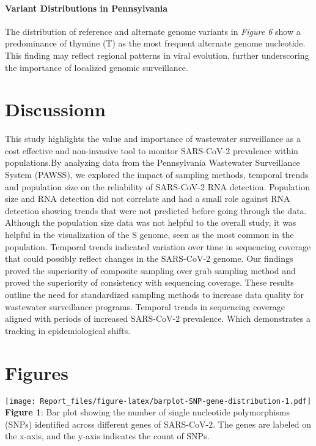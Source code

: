 \documentclass[
]{article}
\begin{document}
\hypertarget{variant-distributions-in-pennsylvania}{%
\paragraph{Variant Distributions in
Pennsylvania}\label{variant-distributions-in-pennsylvania}}

The distribution of reference and alternate genome variants in
\emph{Figure 6} show a predominance of thymine (T) as the most frequent
alternate genome nucleotide. This finding may reflect regional patterns
in viral evolution, further underscoring the importance of localized
genomic surveillance.

\hypertarget{discussionn}{%
\section{Discussionn}\label{discussionn}}

This study highlights the value and importance of wastewater
surveillance as a cost effective and non-invasive tool to monitor
SARS-CoV-2 prevalence within populations.By analyzing data from the
Pennsylvania Wastewater Surveillance System (PAWSS), we explored the
impact of sampling methods, temporal trends and population size on the
reliability of SARS-CoV-2 RNA detection. Population size and RNA
detection did not correlate and had a small role against RNA detection
showing trends that were not predicted before going through the data.
Although the population size data was not helpful to the overall study,
it was helpful in the visualization of the S genome, seen as the most
common in the population. Temporal trends indicated variation over time
in sequencing coverage that could possibly reflect changes in the
SARS-CoV-2 genome. Our findings proved the superiority of composite
sampling over grab sampling method and proved the superiority of
consistency with sequencing coverage. These results outline the need for
standardized sampling methods to increase data quality for wastewater
surveillance programs. Temporal trends in sequencing coverage aligned
with periods of increased SARS-CoV-2 prevalence. Which demonstrates a
tracking in epidemiological shifts.

\hypertarget{figures}{%
\section{Figures}\label{figures}}

\texttt{[image: Report\_files/figure-latex/barplot-SNP-gene-distribution-1.pdf]}
\textbf{Figure 1}: Bar plot showing the number of single nucleotide
polymorphisms (SNPs) identified across different genes of SARS-CoV-2.
The genes are labeled on the x-axis, and the y-axis indicates the count
of SNPs.
\end{document}
